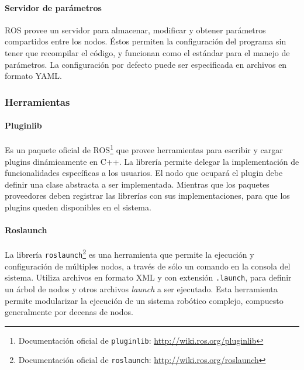 \paragraph{Servidor de parámetros} ROS provee un servidor para almacenar, modificar y obtener parámetros compartidos entre los nodos. Éstos permiten la configuración del programa sin tener que recompilar el código, y funcionan como el estándar para el manejo de parámetros. La configuración por defecto puede ser especificada en archivos en formato YAML.



\subsubsection{Herramientas}

\paragraph{Pluginlib} Es un paquete oficial de ROS\footnote{Documentación oficial de \texttt{pluginlib}: \url{http://wiki.ros.org/pluginlib}} que provee herramientas para escribir y cargar plugins dinámicamente en C++. La librería permite delegar la implementación de funcionalidades específicas a los usuarios. El nodo que ocupará el plugin debe definir una clase abstracta a ser implementada. Mientras que los paquetes proveedores deben registrar las librerías con sus implementaciones, para que los plugins queden disponibles en el sistema.

\paragraph{Roslaunch} La librería \texttt{roslaunch}\footnote{Documentación oficial de \texttt{roslaunch}: \url{http://wiki.ros.org/roslaunch}} es una herramienta que permite la ejecución y configuración de múltiples nodos, a través de sólo un comando en la consola del sistema. Utiliza archivos en formato XML y con extensión \texttt{.launch}, para definir un árbol de nodos y otros archivos \textit{launch} a ser ejecutado. Esta herramienta permite modularizar la ejecución de un sistema robótico complejo, compuesto generalmente por decenas de nodos.



